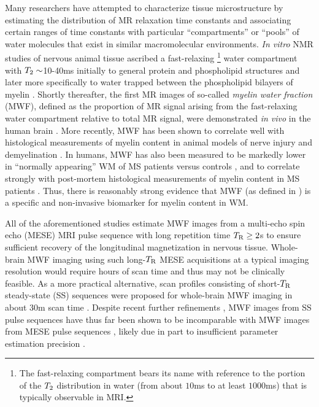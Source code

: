 Many researchers have attempted 
to characterize tissue microstructure
by estimating the distribution
of MR relaxation time constants
and associating certain ranges of time constants
with particular ``compartments'' or ``pools'' of water molecules
that exist in similar macromolecular environments.
\emph{In vitro} NMR studies
of nervous animal tissue
ascribed a fast-relaxing
\footnote{The fast-relaxing compartment bears its name 
	with reference to the portion 
	of the $T_2$ distribution in water
	(from about $10$ms to at least $1000$ms)
	that is typically observable in MRI.
}
water compartment
with $T_2\sim$10-40ms 
initially to general protein 
and phospholipid structures \cite{vasilescu:78:wci}
and later more specifically
to water trapped between
the phospholipid bilayers 
of myelin
\cite{menon:91:aoc, stewart:93:ssr}.
Shortly thereafter,
the first MR images 
of so-called \emph{myelin water fraction} (MWF),
defined as the proportion of MR signal 
arising from the fast-relaxing water compartment
relative to total MR signal,
were demonstrated \emph{in vivo}
in the human brain \cite{mackay:94:ivv}.
More recently,
MWF has been shown 
to correlate well 
with histological measurements
of myelin content 
in animal models
of nerve injury \cite{gareau:00:mta}
and demyelination \cite{webb:03:imt}.
In humans, 
MWF has also been measured 
to be markedly lower
in ``normally appearing'' WM 
of MS patients versus controls \cite{laule:04:wca},
and to correlate strongly 
with post-mortem histological measurements
of myelin content
in MS patients \cite{laule:06:mwi}.
Thus,
there is reasonably strong evidence
that MWF
(as defined in \cite{mackay:94:ivv})
is a specific and non-invasive biomarker
for myelin content in WM.

All of the aforementioned studies
estimate MWF images
from a multi-echo spin echo (MESE) MRI pulse sequence
\cite{carr:54:eod}
with long repetition time $T_\mathrm{R}\geq2$s
to ensure sufficient recovery
of the longitudinal magnetization 
in nervous tissue.
Whole-brain MWF imaging 
using such long-$T_\mathrm{R}$ MESE acquisitions
at a typical imaging resolution
would require hours of scan time
and thus may not be clinically feasible.
As a more practical alternative,
scan profiles consisting of short-$T_\mathrm{R}$ steady-state (SS) sequences
were proposed 
for whole-brain MWF imaging in about 30m scan time
\cite{deoni:08:gmt}.
Despite recent further refinements
\cite{deoni:11:com, deoni:13:oct},
MWF images from SS pulse sequences 
have thus far been shown
to be incomparable with MWF images
from MESE pulse sequences
\cite{zhang:15:com},
likely due in part
to insufficient parameter estimation precision
\cite{lankford:13:oti}.


